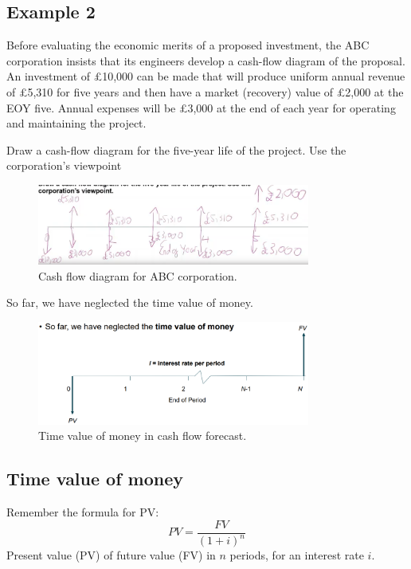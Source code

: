 \subsection{Example 2}
Before evaluating the economic merits of a proposed investment, the ABC corporation insists that its engineers develop a cash-flow diagram of the proposal. An investment of \pounds 10,000 can be made that will produce uniform annual revenue of \pounds 5,310 for five years and then have a market (recovery) value of \pounds 2,000 at the EOY five. Annual expenses will be \pounds 3,000 at the end of each year for operating and maintaining the project.
\begin{quoting}
    Draw a cash-flow diagram for the five-year life of the project. Use the corporation's viewpoint
\end{quoting}
\begin{figure}[H]
    \centering
    \includegraphics[width = 0.8\textwidth]{img/figure55.png}
    \caption{Cash flow diagram for ABC corporation.}
\end{figure}
So far, we have neglected the time value of money.
\begin{figure}[H]
    \centering
    \includegraphics[width = 0.8\textwidth]{img/figure54.png}
    \caption{Time value of money in cash flow forecast.}
\end{figure}
\subsection{Time value of money}
Remember the formula for PV:
\begin{equation}
    PV = \frac{FV}{\left(1+i\right)^n}
\end{equation}
Present value (PV) of future value (FV) in $n$ periods, for an interest rate $i$.

